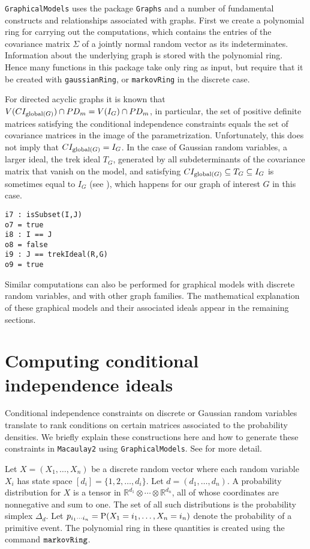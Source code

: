 \documentclass[letterpaper]{article}
\theoremstyle{plain}
\theoremstyle{definition}
\begin{document}
 {\tt GraphicalModels} uses the package {\tt Graphs} and a number of fundamental constructs and relationships 
associated with graphs.  First we create a polynomial ring
for carrying out the computations, which contains the entries of
the covariance matrix $\Sigma$ of a jointly normal random vector
as its indeterminates.  Information about the underlying graph is stored with the polynomial ring. 
Hence many functions in  this package take only ring as input, but require that it be created with {\tt gaussianRing}, or {\tt markovRing} in the discrete case.

For directed acyclic graphs it is known that 
$V(CI_{{\rm global}(G)}) \cap PD_{m}  =  
V(I_{G}) \cap PD_{m}$,
in particular, the set of positive definite matrices
satisfying the conditional independence constraints equals the set of covariance matrices in the image of the parametrization.
Unfortunately, this does not imply that $CI_{{\rm global}(G)} 
=I_{G}$.  In the case of Gaussian random variables, a larger ideal,
the trek ideal $T_{G}$, generated by all subdeterminants of the 
covariance matrix that vanish on the model, and satisfying
$CI_{{\rm global}(G)} \subseteq T_{G} \subseteq
I_{G}$ is sometimes equal to $I_{G}$ (see \cite{STD}), which happens for our
graph of interest $G$ in this case.

\begin{verbatim}
i7 : isSubset(I,J)
o7 = true
i8 : I == J
o8 = false
i9 : J == trekIdeal(R,G)
o9 = true
\end{verbatim}

Similar computations can also be performed for graphical models
with discrete random variables,
and with other graph families.  The mathematical explanation of
these graphical models and their associated ideals
appear in the remaining sections.


\section{Computing conditional independence ideals}\label{CI}

Conditional independence constraints on discrete or Gaussian random variables
 translate to rank conditions on certain matrices
associated to the probability densities.  We briefly explain
these constructions here and how to generate these constraints
in {\tt Macaulay2} using {\tt GraphicalModels}. See \cite[Ch.~3]{DSS}
for more detail.

Let $X = (X_{1}, \ldots, X_{n})$ be a discrete random
vector where each random variable $X_{i}$ has state space
$[d_{i}] = \{1,2, \ldots, d_{i} \}$. Let $d = (d_{1}, \ldots, d_{n})$.  
A probability distribution
for $X$ is a tensor in $\mathbb{R}^{d_{1}}\otimes \cdots \otimes
\mathbb{R}^{d_{n}}$, all of whose 
coordinates are nonnegative and sum to one.
The set of all such distributions is the probability simplex $\Delta_{d}$.
Let $p_{i_{1}\cdots i_{n}} = {\rm P}(X_{1} = i_{1}, \ldots, X_{n} = i_{n})$
denote the probability of a primitive event.  The polynomial
ring in these quantities is created using the command ${\tt markovRing}$.
\end{document}
